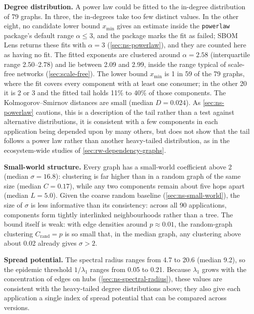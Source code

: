 \textbf{Degree distribution.} A power law could be fitted to the in-degree distribution of 79 graphs. In three, the in-degrees take too few distinct values. In the other eight, no candidate lower bound \(x_{\min}\) gives an estimate inside the \texttt{powerlaw} package's default range \(\alpha \leq 3\), and the package marks the fit as failed; SBOM Lens returns these fits with \(\alpha = 3\) (\autoref{sec:ns-powerlaw}), and they are counted here as having no fit. The fitted exponents are clustered around \(\alpha = 2.58\) (interquartile range 2.50--2.78) and lie between 2.09 and 2.99, inside the range typical of scale-free networks (\autoref{sec:scale-free}). The lower bound \(x_{\min}\) is 1 in 59 of the 79 graphs, where the fit covers every component with at least one consumer; in the other 20 it is 2 or 3 and the fitted tail holds 11\% to 40\% of those components. The Kolmogorov--Smirnov distances are small (median \(D = 0.024\)). As \autoref{sec:ns-powerlaw} cautions, this is a description of the tail rather than a test against alternative distributions, it is consistent with a few components in each application being depended upon by many others, but does not show that the tail follows a power law rather than another heavy-tailed distribution, as in the ecosystem-wide studies of \autoref{sec:rw-dependency-graphs}.

\textbf{Small-world structure.} Every graph has a small-world coefficient above 2 (median \(\sigma = 16.8\)): clustering is far higher than in a random graph of the same size (median \(C = 0.17\)), while any two components remain about five hops apart (median \(L = 5.0\)). Given the coarse random baseline (\autoref{sec:ns-small-world}), the size of \(\sigma\) is less informative than its consistency: across all 90 applications, components form tightly interlinked neighbourhoods rather than a tree. The bound itself is weak: with edge densities around \(p \approx 0.01\), the random-graph clustering \(C_{\mathrm{rand}} = p\) is so small that, in the median graph, any clustering above about 0.02 already gives \(\sigma > 2\).

\textbf{Spread potential.} The spectral radius ranges from 4.7 to 20.6 (median 9.2), so the epidemic threshold \(1/\lambda_1\) ranges from 0.05 to 0.21. Because \(\lambda_1\) grows with the concentration of edges on hubs (\autoref{sec:ns-spectral-radius}), these values are consistent with the heavy-tailed degree distributions above; they also give each application a single index of spread potential that can be compared across versions.

